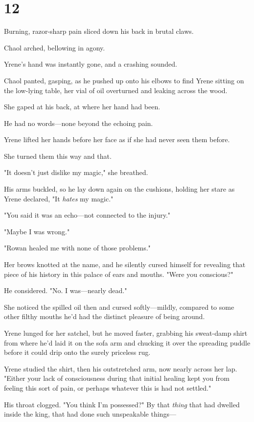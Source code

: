 
\chapter{12}

Burning, razor-sharp pain sliced down his back in brutal claws.

Chaol arched, bellowing in agony.

Yrene's hand was instantly gone, and a crashing sounded.

Chaol panted, gasping, as he pushed up onto his elbows to find Yrene sitting on the low-lying table, her vial of oil overturned and leaking across the wood.

She gaped at his back, at where her hand had been.

He had no words---none beyond the echoing pain.

Yrene lifted her hands before her face as if she had never seen them before.

She turned them this way and that.

"It doesn't just dislike my magic," she breathed.

His arms buckled, so he lay down again on the cushions, holding her stare as Yrene declared, "It \emph{hates} my magic."

"You said it was an echo---not connected to the injury."

"Maybe I was wrong."

"Rowan healed me with none of those problems."

Her brows knotted at the name, and he silently cursed himself for revealing that piece of his history in this palace of ears and mouths. "Were you conscious?"

He considered. "No. I was---nearly dead."

She noticed the spilled oil then and cursed softly---mildly, compared to some other filthy mouths he'd had the distinct pleasure of being around.

Yrene lunged for her satchel, but he moved faster, grabbing his sweat-damp shirt from where he'd laid it on the sofa arm and chucking it over the spreading puddle before it could drip onto the surely priceless rug.

Yrene studied the shirt, then his outstretched arm, now nearly across her lap. "Either your lack of consciousness during that initial healing kept you from feeling this sort of pain, or perhaps whatever this is had not  settled."

His throat clogged. "You think I'm possessed?" By that \emph{thing}
that had dwelled inside the king, that had done such unspeakable things---


